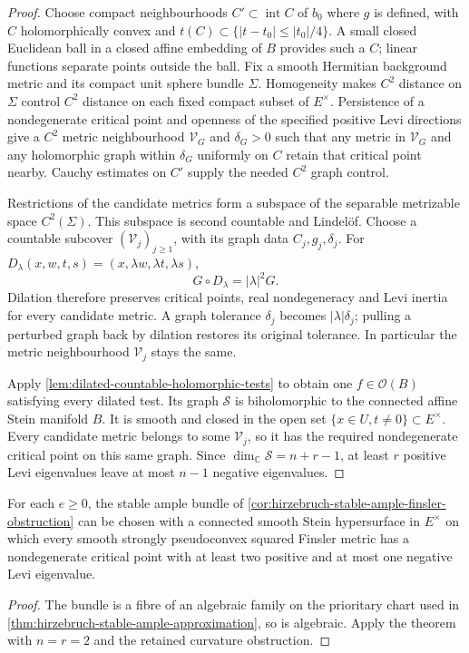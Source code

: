 \begin{proof}
Choose compact neighbourhoods $C'\subset\operatorname{int}C$ of $b_0$
where $g$ is defined, with $C$ holomorphically convex and
$t(C)\subset\{|t-t_0|\leq|t_0|/4\}$.
A small closed Euclidean ball in a closed affine embedding of $B$
provides such a $C$; linear functions separate points outside the ball.
Fix a smooth Hermitian background metric and its compact unit sphere
bundle $\Sigma$. Homogeneity makes $C^2$ distance on $\Sigma$ control
$C^2$ distance on each fixed compact subset of $E^\times$.
Persistence of a nondegenerate critical point and openness of the
specified positive Levi directions give a $C^2$ metric neighbourhood
$\mathcal V_G$ and $\delta_G>0$ such that any metric in $\mathcal V_G$
and any holomorphic graph within $\delta_G$ uniformly on $C$ retain
that critical point nearby. Cauchy estimates on $C'$ supply the needed
$C^2$ graph control.

Restrictions of the candidate metrics form a subspace of the separable
metrizable space $C^2(\Sigma)$. This subspace is second countable and
Lindel\"of. Choose a countable subcover $(\mathcal V_j)_{j\geq1}$,
with its graph data $C_j,g_j,\delta_j$.
For $D_\lambda(x,w,t,s)=(x,\lambda w,\lambda t,\lambda s)$,
\[
 G\circ D_\lambda=|\lambda|^2G.
\]
Dilation therefore preserves critical points, real nondegeneracy and
Levi inertia for every candidate metric. A graph tolerance $\delta_j$
becomes $|\lambda|\delta_j$; pulling a perturbed graph back by dilation
restores its original tolerance. In particular the metric neighbourhood
$\mathcal V_j$ stays the same.

Apply \cref{lem:dilated-countable-holomorphic-tests} to obtain one
$f\in\mathcal O(B)$ satisfying every dilated test.
Its graph $\mathcal S$ is biholomorphic to the connected affine Stein
manifold $B$. It is smooth and closed in the open set
$\{x\in U,t\neq0\}\subset E^\times$.
Every candidate metric belongs to some $\mathcal V_j$, so it has the
required nondegenerate critical point on this same graph.
Since $\dim_{\mathbb C}\mathcal S=n+r-1$, at least $r$ positive Levi
eigenvalues leave at most $n-1$ negative eigenvalues.
\end{proof}

\begin{corollary}\label{cor:hirzebruch-fixed-stein-hypersurface}
For each $e\geq0$, the stable ample bundle of
\cref{cor:hirzebruch-stable-ample-finsler-obstruction} can be chosen with
a connected smooth Stein hypersurface in $E^\times$ on which every
smooth strongly pseudoconvex squared Finsler metric has a nondegenerate
critical point with at least two positive and at most one negative
Levi eigenvalue.
\end{corollary}
\begin{proof}
The bundle is a fibre of an algebraic family on the prioritary chart
used in \cref{thm:hirzebruch-stable-ample-approximation}, so is algebraic.
Apply the theorem with $n=r=2$ and the retained curvature obstruction.
\end{proof}

